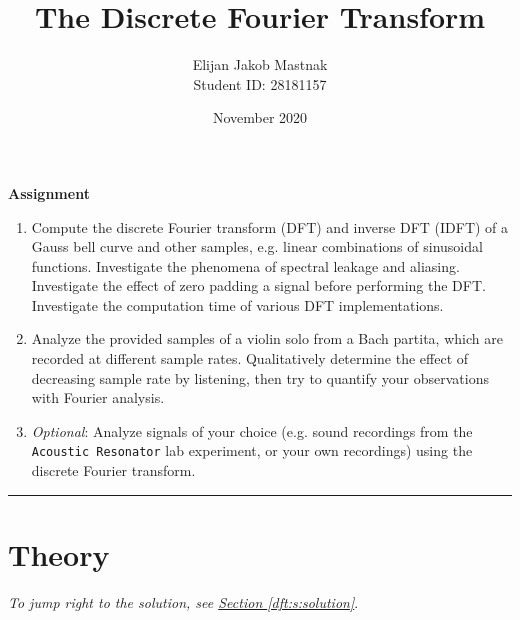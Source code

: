 \documentclass[11pt, a4paper]{article}
\begin{document}
\title{The Discrete Fourier Transform}
\author{Elijan Jakob Mastnak\\[1mm]\small{Student ID: 28181157}}
\date{November 2020}
\maketitle

\tableofcontents

\newpage
\begin{center}
\textbf{Assignment}
\begin{enumerate}
	\item Compute the discrete Fourier transform (DFT) and inverse DFT (IDFT) of a Gauss bell curve and other samples, e.g. linear combinations of sinusoidal functions. Investigate the phenomena of spectral leakage and aliasing. Investigate the effect of zero padding a signal before performing the DFT. Investigate the computation time of various DFT implementations. 
	
	\item Analyze the provided samples of a violin solo from a Bach partita, which are recorded at different sample rates. Qualitatively determine the effect of decreasing sample rate by listening, then try to quantify your observations with Fourier analysis.
	
	\item \textit{Optional}: Analyze signals of your choice (e.g. sound recordings from the \texttt{Acoustic Resonator} lab experiment, or your own recordings) using the discrete Fourier transform.
\end{enumerate}
\end{center}

\vspace{2mm}

\rule{\textwidth}{0.2pt}


\section{Theory} \label{dft:s:theory}
\vspace{-2mm}
\textit{To jump right to the solution, see \hyperref[dft:s:solution]{Section \ref{dft:s:solution}}}.
\end{document}
